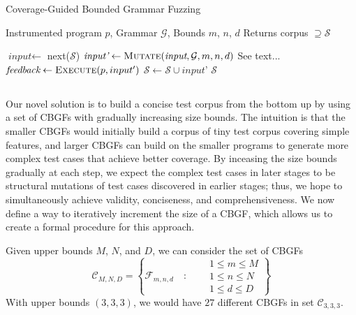 \documentclass[conference]{IEEEtran}
\begin{document}
\begin{algorithm}[t]
\caption{Coverage-Guided Bounded Grammar Fuzzing}
\label{zest-algo}
\begin{algorithmic}[1]
\small
\Require Instrumented program $p$, Grammar $\mathcal{G}$, Bounds $m$, $n$, $d$
 \Comment Returns corpus $\supseteq       \mathcal{S}$    

\Repeat 
        \State $\textit{input} \gets$ next($\mathcal{S}$) 
        \State $\textit{input'} \gets \textproc{Mutate}(\textit{input}, \mathcal{G}, m, n, d)$  \label{line:zest-algo-mutate} \Comment See text...
        \State $\textit{feedback} \gets \textproc{Execute}(p, input')$ 
          \label{line:zest-algo-interesting} 
            \State $\mathcal{S} \gets \mathcal{S} \cup \textit{input'}$
        \EndIf
{}
    \State \Return $\mathcal{S}$ 
\EndFunction
\end{algorithmic}
\end{algorithm}













\subsection{\TECH{}}
\label{sec:bonsai}





Our novel solution is to build a concise test corpus from the bottom up by using a set of CBGFs with gradually increasing size bounds. The intuition is that the smaller CBGFs would initially build a corpus of tiny test corpus covering simple features, and larger CBGFs can build on the smaller programs to generate more complex test cases that achieve better coverage. By inceasing the size bounds gradually at each step, we expect the complex test cases in later stages to be structural mutations of test cases discovered in earlier stages; thus, we hope to simultaneously achieve validity, conciseness, and comprehensiveness. We now define a way to iteratively increment the size of a CBGF, which allows us to create a formal procedure for this approach.  

Given upper bounds $M$, $N$, and $D$, we can consider the set of CBGFs
\begin{equation*}
    \mathcal{C}_{M,N,D} = \left\{\mathcal{F}_{m, n, d} \quad :
    \begin{aligned}\quad & 1 \le m \le M \\ &1 \le n \le N \\ &1 \le d \le D
    \end{aligned}
    \right\}
\end{equation*}
With upper bounds $(3, 3, 3)$, we would have $27$ different CBGFs in set $\mathcal{C}_{3,3,3}$. 
\end{document}
